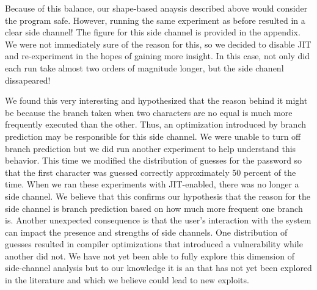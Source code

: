 Because of this balance, our shape-based anaysis described above would consider the program safe. However, running the same experiment as before resulted in a clear side channel! The figure for this side channel is provided in the appendix. We were not immediately sure of the reason for this, so we decided to disable JIT and re-experiment in the hopes of gaining more insight. In this case, not only did each run take almost two orders of magnitude longer, but the side chanenl dissapeared!

We found this very interesting and hypothesized that the reason behind it might be because the branch taken when two characters are no equal is much more frequently executed than the other. Thus, an optimization introduced by branch prediction may be responsible for this side channel. We were unable to turn off branch prediction but we did run another experiment to help understand this behavior. This time we modified the distribution of guesses for the password so that the first character was guessed correctly approximately 50 percent of the time. When we ran these experiments with JIT-enabled, there was no longer a side channel. We believe that this confirms our hypothesis that the reason for the side channel is branch prediction based on how much more frequent one branch is. Another unexpected consequence is that the user's interaction with the system can impact the presence and strengths of side channels. One distribution of guesses resulted in compiler optimizations that introduced a vulnerability while another did not. We have not yet been able to fully explore this dimension of side-channel analysis but to our knowledge it is an that has not yet been explored in the literature and which we believe could lead to new exploits. 

